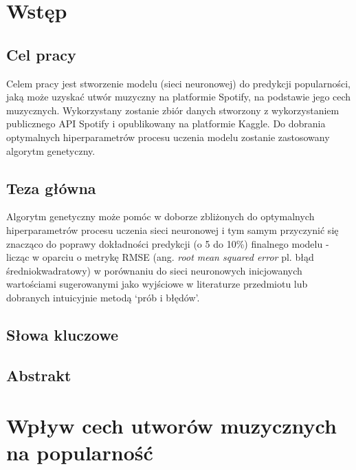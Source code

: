 \documentclass[a4paper,11pt]{article}
\begin{document}
    \newpage

    \maketitle

    \tableofcontents

    \newpage


    \section{Wstęp}

    \subsection{Cel pracy}

    Celem pracy jest stworzenie modelu (sieci neuronowej) do predykcji popularności, jaką może uzyskać utwór muzyczny na platformie Spotify, na podstawie jego cech muzycznych. Wykorzystany zostanie zbiór danych stworzony z wykorzystaniem publicznego API Spotify i opublikowany na platformie Kaggle. Do dobrania optymalnych hiperparametrów procesu uczenia modelu zostanie zastosowany algorytm genetyczny.

    \subsection{Teza główna}

    Algorytm genetyczny może pomóc w doborze zbliżonych do optymalnych hiperparametrów procesu uczenia sieci neuronowej i tym samym przyczynić się znacząco do poprawy dokładności predykcji (o 5 do 10\%) finalnego modelu - licząc w oparciu o metrykę RMSE (ang. \textit{root mean squared error} pl. błąd średniokwadratowy) w porównaniu do sieci neuronowych inicjowanych wartościami sugerowanymi jako wyjściowe w literaturze przedmiotu lub dobranych intuicyjnie metodą `prób i błędów'.

    \subsection{Słowa kluczowe} %

    \subsection{Abstrakt} %


    \section{Wpływ cech utworów muzycznych na popularność}
\end{document}

